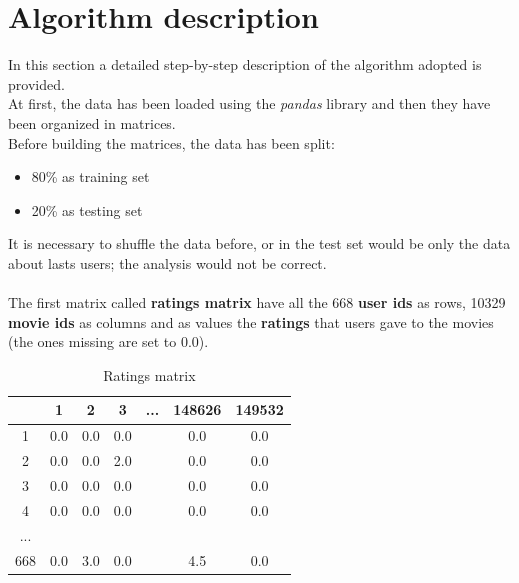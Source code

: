 \documentclass{article}
\begin{document}
\section{Algorithm description}
In this section a detailed step-by-step description of the algorithm adopted is provided.\\
At first, the data has been loaded using the \textsl{pandas} library and then they have been organized in matrices.\\
Before building the matrices, the data has been split:
\begin{itemize}
      \item 80\% as training set
      \item 20\% as testing set
\end{itemize}
It is necessary to shuffle the data before, or in the test set would be only the data about lasts users; the analysis would not be correct.\\ \\
The first matrix called \textbf{ratings matrix} have all the 668 \textbf{user ids} as rows, 10329 \textbf{movie ids} as columns and as values the \textbf{ratings} that users gave to the movies (the ones missing are set to 0.0).\\
\begin{table}[ht]
      \begin{center}
            \begin{tabular}{ | c | c | c | c | c | c | c |} 
              \hline
              \rowcolor{lightgray}  & 1 & 2 & 3 & ... & 148626 & 149532 \\ 
              \hline
               \cellcolor{lightgray}1 & 0.0 & 0.0 & 0.0 &  & 0.0 & 0.0 \\ 
              \hline
              \cellcolor{lightgray}2 & 0.0 & 0.0 & 2.0 &  & 0.0 & 0.0 \\ 
              \hline
              \cellcolor{lightgray}3 & 0.0 & 0.0 & 0.0 &  & 0.0 & 0.0\\
              \hline
              \cellcolor{lightgray}4 & 0.0 & 0.0 & 0.0 &  & 0.0 & 0.0\\
              \hline
              \cellcolor{lightgray}... &  &  &  &  &  & \\ 
              \hline
              \cellcolor{lightgray}668 & 0.0 & 3.0 & 0.0 &  & 4.5 & 0.0\\
              \hline
            \end{tabular}
            \caption{Ratings matrix}
            \label{tab: Ratings matrix}
      \end{center}
\end{table}
\end{document}
